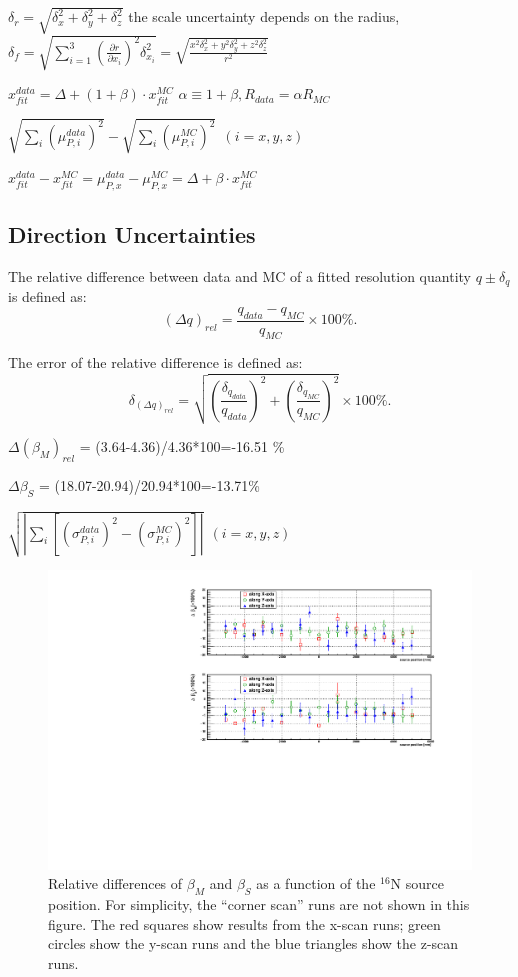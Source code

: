 $\delta_r = \sqrt{\delta_x^2+\delta_y^2+\delta_z^2}$
the scale uncertainty depends on the radius,
$\delta_f =\sqrt{\sum_{i=1}^3(\frac{\partial r}{\partial x_i})^2\delta^2_{x_i}}=\sqrt{\frac{x^2\delta^2_x+y^2\delta^2_y+z^2\delta^2_z}{r^2}}$

$x^{data}_{fit}=\Delta+(1+\beta)\cdot x^{MC}_{fit}$
$\alpha\equiv 1+\beta, R_{data}=\alpha R_{MC}$


$\sqrt{\sum_i(\mu^{data}_{P,i})^2}-\sqrt{\sum_i(\mu^{MC}_{P,i})^2}~~(i=x,y,z)$

$x^{data}_{fit}-x^{MC}_{fit}=\mu^{data}_{P,x}-\mu^{MC}_{P,x}=\Delta+\beta\cdot x^{MC}_{fit}$

\subsection{Direction Uncertainties}
The relative difference between data and MC of a fitted resolution quantity $q\pm \delta_q$ is defined as:
\begin{equation}
(\Delta q)_{rel} = \frac{q_{data}-q_{MC}}{q_{MC}}\times 100\%.
\end{equation}

The error of the relative difference is defined as: 
\begin{equation}
\delta_{(\Delta q)_{rel}} = \sqrt{(\frac{\delta_{q_{data}}}{q_{data}})^2+(\frac{\delta_{q_{MC}}}{q_{MC}})^2}\times 100\%.
\end{equation}


$\Delta (\beta_{M})_{rel}$ = (3.64-4.36)/4.36*100=-16.51 \%

$\Delta \beta_{S}$  = (18.07-20.94)/20.94*100=-13.71\%

$\sqrt{|\sum_i[(\sigma^{data}_{P,i})^2-(\sigma^{MC}_{P,i})^2]|}~~(i=x,y,z)$

\begin{figure}[!htb]\label{direction_scan}
	\centering
	\includegraphics[width=18cm]{angularResol_scanXYZ.pdf}
	\caption{Relative differences of $\beta_M$ and $\beta_S$ as a function of the $^{16}$N source position. For simplicity, the ``corner scan'' runs are not shown in this figure. The red squares show results from the x-scan runs; green circles show the y-scan runs and the blue triangles show the z-scan runs.}
\end{figure}


